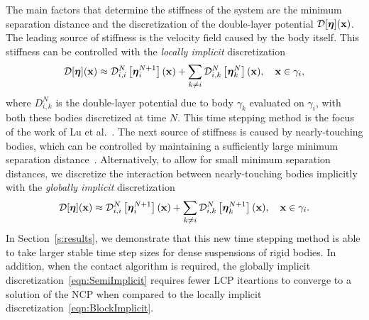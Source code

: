 \documentclass[AMA,STIX1COL]{WileyNJD-v2}
\begin{document}
The main factors that determine the stiffness of the system are the
minimum separation distance and the discretization of the double-layer
potential ${\mathcal{D}}[{\boldsymbol\eta}]({\mathbf{x}})$.  The leading source of stiffness is the
velocity field caused by the body itself. This stiffness can be
controlled with the {\em locally implicit} discretization
\begin{align}
  {\mathcal{D}}[{\boldsymbol\eta}]({\mathbf{x}}) \approx {\mathcal{D}}^{N}_{i,i}\left[{\boldsymbol\eta}_i^{N+1}\right]({\mathbf{x}}) + 
    \sum_{k \neq i} {\mathcal{D}}^{N}_{i,k}\left[{\boldsymbol\eta}_k^{N}\right]({\mathbf{x}}),
    \quad {\mathbf{x}} \in \gamma_i,
  \label{eqn:BlockImplicit}
\end{align}
where $D_{i,k}^N$ is the double-layer potential due to body $\gamma_k$
evaluated on $\gamma_i$, with both these bodies discretized at time $N$.
This time stepping method is the focus of the work of Lu et
al.~\cite{Lu2017}.  The next source of stiffness is caused by
nearly-touching bodies, which can be controlled by maintaining a
sufficiently large minimum separation distance~\cite{Lu2017}.
Alternatively, to allow for small minimum separation distances, we
discretize the interaction between nearly-touching bodies implicitly
with the {\em globally implicit} discretization
\begin{align}
  {\mathcal{D}}[{\boldsymbol\eta}]({\mathbf{x}}) \approx {\mathcal{D}}^{N}_{i,i}\left[{\boldsymbol\eta}_i^{N+1}\right]({\mathbf{x}}) + 
    \sum_{k \neq i} {\mathcal{D}}^{N}_{i,k}\left[{\boldsymbol\eta}_k^{N+1}\right]({\mathbf{x}}),
    \quad {\mathbf{x}} \in \gamma_i.
  \label{eqn:SemiImplicit}
\end{align}
In Section~\ref{s:results}, we demonstrate that this new time stepping
method is able to take larger stable time step sizes for dense
suspensions of rigid bodies.  In addition, when the contact algorithm is
required, the globally implicit discretization~\eqref{eqn:SemiImplicit}
requires fewer LCP iteartions to converge to a solution of the NCP when
compared to the locally implicit
discretization~\eqref{eqn:BlockImplicit}.
\end{document}
